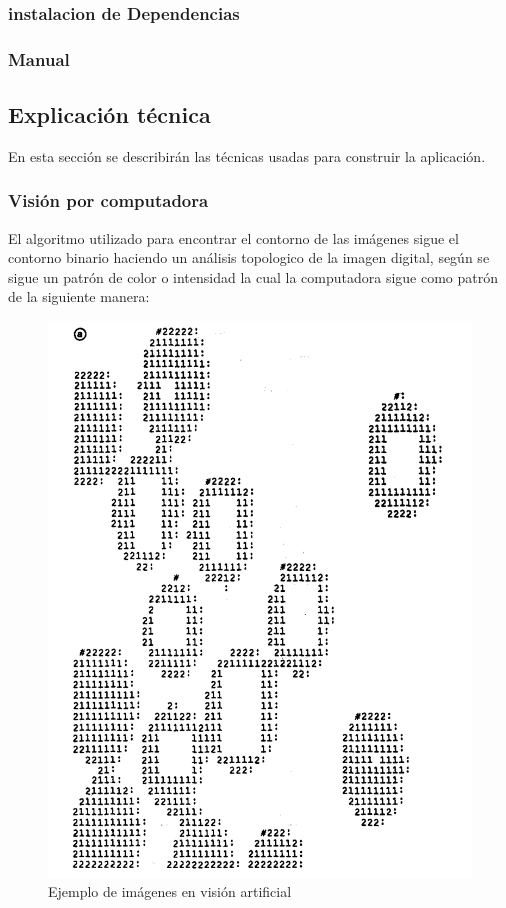 \documentclass{article}
\begin{document}
\subsubsection{instalacion de Dependencias}
\subsubsection{Manual}
\subsection{Explicación técnica}
En esta secci\'on se describir\'an las t\'ecnicas usadas para construir la aplicaci\'on.
\subsubsection{Visi\'on por computadora}
El algoritmo utilizado para encontrar el contorno de las im\'agenes sigue el contorno binario haciendo
un an\'alisis topologico de la imagen digital, según \cite{test} se sigue un patr\'on de color o intensidad
la cual la computadora sigue como patr\'on de la siguiente manera:
\begin{figure}[H]
\caption{Ejemplo de im\'agenes en visi\'on artificial}
\centering
\includegraphics[scale=.20]{a}
\end{figure}
\end{document}
